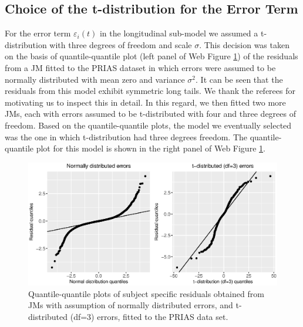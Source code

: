 \subsection{Choice of the t-distribution for the Error Term}
\label{subsec : t_dist_choice}
For the error term $\varepsilon_i(t)$ in the longitudinal sub-model we assumed a t-distribution with three degrees of freedom and scale $\sigma$. This decision was taken on the basis of quantile-quantile plot (left panel of Web Figure \ref{fig : qqplot_norm_t3_web}) of the residuals from a JM fitted to the PRIAS dataset in which errors were assumed to be normally distributed with mean zero and variance $\sigma^2$. It can be seen that the residuals from this model exhibit symmetric long tails. We thank the referees for motivating us to inspect this in detail. In this regard, we then fitted two more JMs, each with errors assumed to be t-distributed with four and three degrees of freedom. Based on the quantile-quantile plots, the model we eventually selected was the one in which t-distribution had three degrees freedom. The quantile-quantile plot for this model is shown in the right panel of Web Figure \ref{fig : qqplot_norm_t3_web}.

\begin{figure}[!htb]
\centerline{\includegraphics[width=\columnwidth]{images/model_fit/qqplot_norm_t3.eps}}
\caption{Quantile-quantile plots of subject specific residuals obtained from JMs with assumption of normally distributed errors, and t-distributed (df=3) errors, fitted to the PRIAS data set.}
\label{fig : qqplot_norm_t3_web}
\end{figure}

\clearpage

